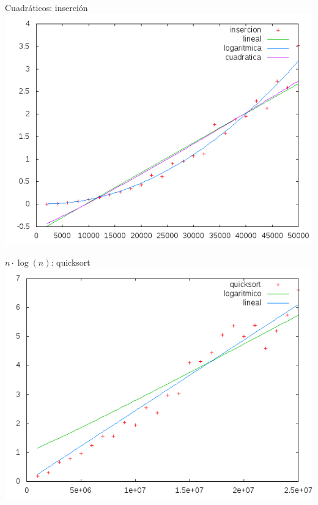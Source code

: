 \documentclass[10pt,compress,usetitleprogressbar,mathserif]{beamer}
\begin{document}
\begin{frame}{Cuadráticos: inserción}
	\includegraphics[width = \textwidth ]{img/cuad_hibrida.pdf}
\end{frame}

\begin{frame}{$n \cdot \log(n)$: quicksort}
	\includegraphics[width = \textwidth ]{img/log_hibrida.pdf}
\end{frame}
\end{document}
